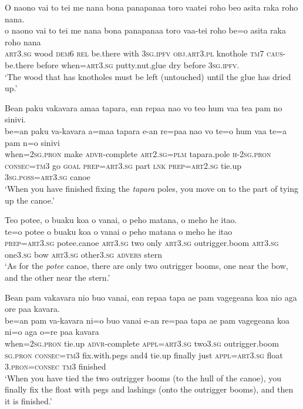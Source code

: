 \ea\label{ex:text18-42}
O naono vai to tei me nana bona panapanaa toro vaatei roho beo asita raka roho nana.\\
\gll o	naono	vai	to	tei	me	nana	bona	panapanaa	toro	vaa-tei	roho	be=o	asita	raka	roho	nana\\
     \textsc{art}3.\textsc{sg}	wood	\textsc{dem}6	\textsc{rel}	be.there	with	3\textsc{sg}.\textsc{ipfv}	\textsc{obj}.\textsc{art}3.\textsc{pl}	knothole	\textsc{tm}7	\textsc{caus}-be.there	before	when=\textsc{art}3.\textsc{sg}	putty.nut.glue	dry	before	3\textsc{sg}.\textsc{ipfv}.\\
\glt `The wood that has knotholes must be left (untouched) until the glue has dried up.'
\z

\ea\label{ex:text18-43}
Bean paku vakavara amaa tapara, ean repaa nao vo teo hum vaa tea pam no sinivi.\\
\gll be=an	paku	va-kavara	a=maa	tapara	e-an	re=paa	nao	vo	te=o	hum	vaa	te=a	pam	n=o	sinivi\\
     when=2\textsc{sg}.\textsc{pron}	make	\textsc{advr}-complete	\textsc{art}2.\textsc{sg}=\textsc{plm}	tapara.pole	\textsc{h}-2\textsc{sg}.\textsc{pron}	\textsc{consec}=\textsc{tm}3	go	\textsc{goal}	\textsc{prep}=\textsc{art}3.\textsc{sg}	part	\textsc{lnk}	\textsc{prep}=\textsc{art}2.\textsc{sg}	tie.up	3\textsc{sg}.\textsc{poss}=\textsc{art}3.\textsc{sg}	canoe\\
\glt `When you have finished fixing the \textit{tapara} poles, you move on to the part of tying up the canoe.'
\z

\ea\label{ex:text18-44}
Teo potee, o buaku koa o vanai, o peho matana, o meho he itao.\\
\gll te=o	potee	o	buaku	koa	o   vanai	o	peho	matana	o	meho	he	itao\\
     \textsc{prep}=\textsc{art}3.\textsc{sg}	potee.canoe	\textsc{art}3.\textsc{sg}	two	only	\textsc{art}3.\textsc{sg}	outrigger.boom	\textsc{art}3.\textsc{sg}	one3.\textsc{sg}	bow	\textsc{art}3.\textsc{sg}	other3.\textsc{sg}	\textsc{advers}	stern\\
\glt `As for the \textit{potee} canoe, there are only two outrigger booms, one near the bow, and the other near the stern.'
\z

\newpage
\ea\label{ex:text18-45}
Bean pam vakavara nio buo vanai, ean repaa tapa ae pam vagegeana koa nio aga ore paa kavara.\\
\gll be=an	pam	va-kavara	ni=o	buo	vanai	e-an	re=paa	tapa	ae	pam	vagegeana	koa	ni=o	aga	o=re	paa	kavara\\
     when=2\textsc{sg}.\textsc{pron}	tie.up	\textsc{advr}-complete	\textsc{appl}=\textsc{art}3.\textsc{sg}	two3.\textsc{sg}	outrigger.boom	\textsc{sg}.\textsc{pron}	\textsc{consec}=\textsc{tm}3	fix.with.pegs	and4	tie.up	finally	just	\textsc{appl}=\textsc{art}3.\textsc{sg}	float	3.\textsc{pron}=\textsc{consec}	\textsc{tm}3	finished\\
\glt `When you have tied the two outrigger booms (to the hull of the canoe), you finally fix the float with pegs and lashings (onto the outrigger booms), and then it is finished.'
\z

